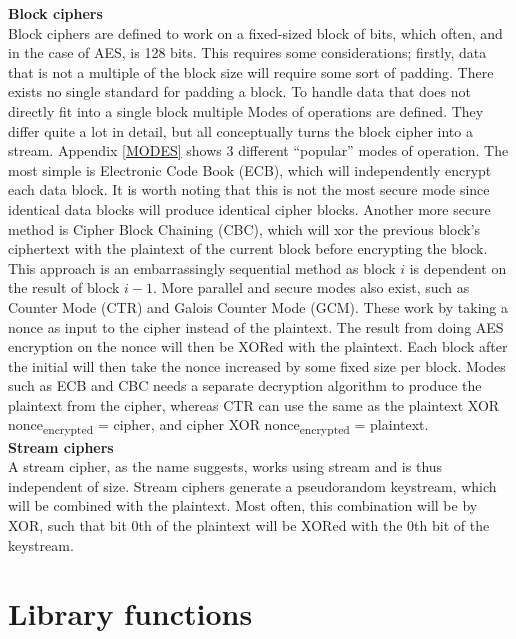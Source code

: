 \documentclass[a4paper, openany]{book}
\begin{document}
\begin{abstact}
\textbf{Block ciphers}\\
Block ciphers are defined to work on a fixed-sized block of bits, which often, and in the case of AES, is 128 bits. This requires some considerations; firstly, data that is not a multiple of the block size will require some sort of padding. There exists no single standard for padding a block. To handle data that does not directly fit into a single block multiple Modes of operations are defined. They differ quite a lot in detail, but all conceptually turns the block cipher into a stream. Appendix \ref{MODES} shows 3 different ``popular'' modes of operation. The most simple is Electronic Code Book (ECB), which will independently encrypt each data block. It is worth noting that this is not the most secure mode since identical data blocks will produce identical cipher blocks. Another more secure method is Cipher Block Chaining (CBC), which will xor the previous block's ciphertext with the plaintext of the current block before encrypting the block. This approach is an embarrassingly sequential method as block \(i\) is dependent on the result of block \(i-1\). More parallel and secure modes also exist, such as Counter Mode (CTR) and Galois Counter Mode (GCM). These work by taking a nonce as input to the cipher instead of the plaintext. The result from doing AES encryption on the nonce will then be XORed with the plaintext. Each block after the initial will then take the nonce increased by some fixed size per block. Modes such as ECB and CBC needs a separate decryption algorithm to produce the plaintext from the cipher, whereas CTR can use the same as the plaintext XOR nonce\textsubscript{encrypted} = cipher, and cipher XOR nonce\textsubscript{encrypted} = plaintext.\\

\textbf{Stream ciphers}\\
A stream cipher, as the name suggests, works using stream and is thus independent of size. Stream ciphers generate a pseudorandom keystream, which will be combined with the plaintext. Most often, this combination will be by XOR, such that bit 0th of the plaintext will be XORed with the 0th bit of the keystream.
\chapter{Library functions}
\label{sec:orgd34ad04}

\end{abstact}
\end{document}
